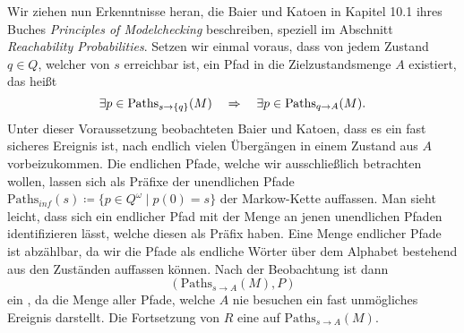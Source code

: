 \documentclass[a4paper]{article}
\newcommand{\mc}{Markow-Kette}
\theoremstyle{nonumberplain}
\begin{document}
Wir ziehen nun Erkenntnisse heran, die Baier und Katoen in Kapitel 10.1 ihres Buches \textit{Principles of Modelchecking} \cite{Bai08} beschreiben, speziell im Abschnitt \textit{Reachability Probabilities}.
Setzen wir einmal voraus, dass von jedem Zustand $q\in Q$, welcher von $s$ erreichbar ist, ein Pfad in die Zielzustandsmenge $A$ existiert, das heißt
\[
\exists p \in \mathrm{Paths}_{s \rightarrow \{q\}}(M)  \quad \Rightarrow \quad \exists p \in \mathrm{Paths}_{q \rightarrow A}(M) \text{.}
\]
 Unter dieser Voraussetzung beobachteten Baier und Katoen, dass es ein fast sicheres Ereignis ist, nach endlich vielen Übergängen in einem Zustand aus $A$ vorbeizukommen.
Die endlichen Pfade, welche wir ausschließlich betrachten wollen, lassen sich als Präfixe der unendlichen Pfade $\mathrm{Paths}_{inf}(s) \coloneqq \{p \in Q^\omega \mid p(0) = s\}$ der \mc{} auffassen.
Man sieht leicht, dass sich ein endlicher Pfad mit der Menge an jenen unendlichen Pfaden identifizieren lässt, welche diesen als  Präfix haben.
Eine Menge endlicher Pfade ist abzählbar, da wir die Pfade als endliche Wörter über dem Alphabet bestehend aus den Zuständen auffassen können.
Nach der Beobachtung ist dann
\[
(\mathrm{Paths}_{s \rightarrow A}(M), P)
\] ein \probspace{}, da die Menge aller Pfade, welche $A$ nie besuchen ein fast unmögliches Ereignis darstellt. Die Fortsetzung von $R$ eine \rvar{} auf $\mathrm{Paths}_{s \rightarrow A}(M)$. 
\end{document}
